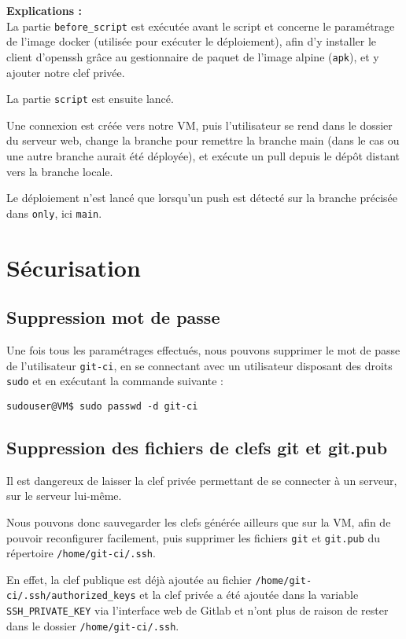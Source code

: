 \textbf{Explications :}\\
La partie \texttt{before\_script} est exécutée avant le script et concerne le paramétrage de l'image docker (utilisée pour exécuter le déploiement), afin d'y installer le client d'openssh grâce au gestionnaire de paquet de l'image alpine (\texttt{apk}), et y ajouter notre clef privée.

La partie \texttt{script} est ensuite lancé.

Une connexion est créée vers notre VM, puis l'utilisateur se rend dans le dossier du serveur web, change la branche pour remettre la branche main (dans le cas ou une autre branche aurait été déployée), et exécute un pull depuis le dépôt distant vers la branche locale.

Le déploiement n'est lancé que lorsqu'un push est détecté sur la branche précisée dans \texttt{only}, ici \texttt{main}.





\section{Sécurisation}
\subsection{Suppression mot de passe}
Une fois tous les paramétrages effectués, nous pouvons supprimer le mot de passe de l'utilisateur \texttt{git-ci}, en se connectant avec un utilisateur disposant des droits \texttt{sudo} et en exécutant la commande suivante :


    \begin{verbatim}
sudouser@VM$ sudo passwd -d git-ci    
    \end{verbatim}


\subsection{Suppression des fichiers de clefs git et git.pub}
Il est dangereux de laisser la clef privée permettant de se connecter à un serveur, sur le serveur lui-même. 

Nous pouvons donc sauvegarder les clefs générée ailleurs que sur la VM, afin de pouvoir reconfigurer facilement, puis supprimer les fichiers \texttt{git} et \texttt{git.pub} du répertoire \texttt{/home/git-ci/.ssh}. 

En effet, la clef publique est déjà ajoutée au fichier \texttt{/home/git-ci/.ssh/authorized\_keys} et la clef privée a été ajoutée dans la variable \texttt{SSH\_PRIVATE\_KEY} via l'interface web de Gitlab et n'ont plus de raison de rester dans le dossier \texttt{/home/git-ci/.ssh}.

